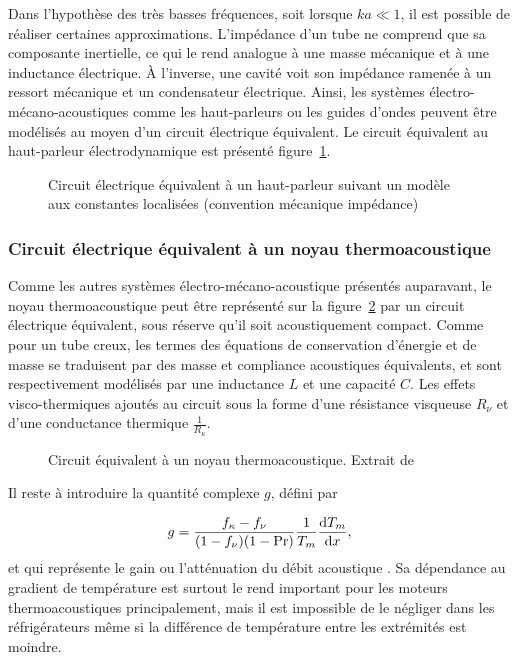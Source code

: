 Dans l'hypothèse des très basses fréquences, soit lorsque $ka \ll 1$, il est possible de réaliser certaines approximations. L'impédance d'un tube ne comprend que sa composante inertielle, ce qui le rend analogue à une masse mécanique et à une inductance électrique. À l'inverse, une cavité voit son impédance ramenée à un ressort mécanique et un condensateur électrique. Ainsi, les systèmes électro-mécano-acoustiques comme les haut-parleurs ou les guides d'ondes peuvent être modélisés au moyen d'un circuit électrique équivalent. Le circuit équivalent au haut-parleur électrodynamique est présenté figure~\ref{fig:HP_LEM}.

\begin{figure}[!ht]
    \centering
    
    \caption{Circuit électrique équivalent à un haut-parleur suivant un modèle aux constantes localisées (convention mécanique impédance)}
    \label{fig:HP_LEM}
\end{figure}

\subsubsection{Circuit électrique équivalent à un noyau thermoacoustique}

Comme les autres systèmes électro-mécano-acoustique présentés auparavant, le noyau thermoacoustique peut être représenté sur la figure~\ref{fig:CircEquivTAC} par un circuit électrique équivalent, sous réserve qu'il soit acoustiquement compact. Comme pour un tube creux, les termes des équations de conservation d'énergie et de masse se traduisent par des masse et compliance acoustiques équivalents, et sont respectivement modélisés par une inductance $L$ et une capacité $C$. Les effets visco-thermiques ajoutés au circuit sous la forme d'une résistance visqueuse $R_\nu$ et d'une conductance thermique $\frac{1}{R_\kappa}$.

\begin{figure}[!ht]
    \centering
    
    \caption{Circuit équivalent à un noyau thermoacoustique. Extrait de \cite{swift_thermoacoustics_2017}}
    \label{fig:CircEquivTAC}
\end{figure}

Il reste à introduire la quantité complexe $g$, défini par 

\begin{equation}
    g = \frac{f_\kappa - f_\nu}{(1-f_\nu)(1-\mathrm{Pr})}\frac{1}{T_m}\frac{\mathrm{d} T_m}{\mathrm{d} x},
    \label{eq:GainNoyauTA_Swift}
\end{equation}
et qui représente le gain ou l'atténuation du débit acoustique \cite{swift_thermoacoustics_2017}. Sa dépendance au gradient de température est surtout le rend important pour les moteurs thermoacoustiques principalement, mais il est impossible de le négliger dans les réfrigérateurs même si la différence de température entre les extrémités est moindre.

